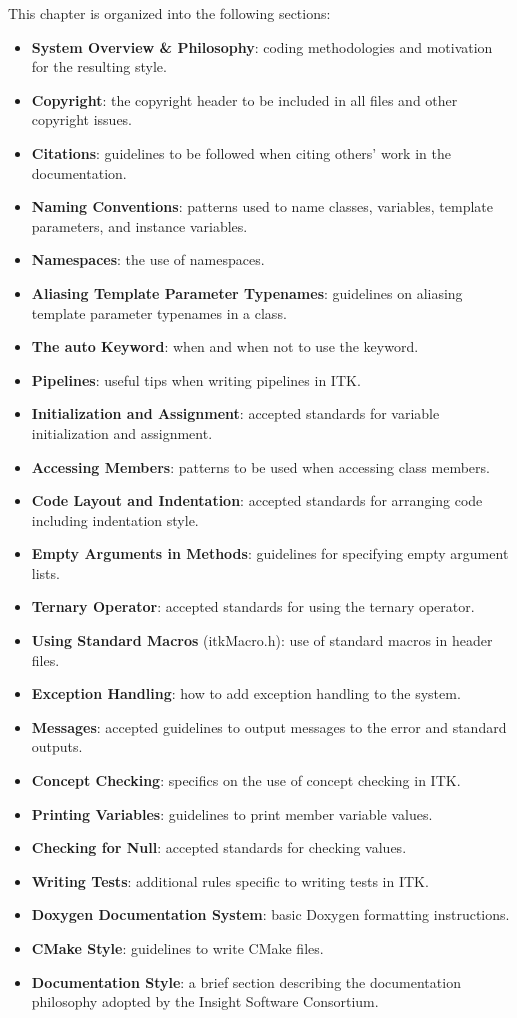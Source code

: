 This chapter is organized into the following sections:
\begin{itemize}
\item \textbf{System Overview \& Philosophy}: coding methodologies and
motivation for the resulting style.
\item \textbf{Copyright}: the copyright header to be included in all files and
other copyright issues.
\item \textbf{Citations}: guidelines to be followed when citing others' work in
the documentation.
\item \textbf{Naming Conventions}: patterns used to name classes, variables,
template parameters, and instance variables.
\item \textbf{Namespaces}: the use of namespaces.
\item \textbf{Aliasing Template Parameter Typenames}: guidelines on aliasing
template parameter typenames in a class.
\item \textbf{The auto Keyword}: when and when not to use the 
keyword.
\item \textbf{Pipelines}: useful tips when writing pipelines in ITK.
\item \textbf{Initialization and Assignment}: accepted standards for variable
initialization and assignment.
\item \textbf{Accessing Members}: patterns to be used when accessing class
members.
\item \textbf{Code Layout and Indentation}: accepted standards for arranging
code including indentation style.
\item \textbf{Empty Arguments in Methods}: guidelines for specifying empty
argument lists.
\item \textbf{Ternary Operator}: accepted standards for using the ternary
operator.
\item \textbf{Using Standard Macros} (itkMacro.h): use of standard macros in
header files.
\item \textbf{Exception Handling}: how to add exception handling to the system.
\item \textbf{Messages}: accepted guidelines to output messages to the error
and standard outputs.
\item \textbf{Concept Checking}: specifics on the use of concept checking in
ITK.
\item \textbf{Printing Variables}: guidelines to print member variable values.
\item \textbf{Checking for Null}: accepted standards for checking 
values.
\item \textbf{Writing Tests}: additional rules specific to writing tests in ITK.
\item \textbf{Doxygen Documentation System}: basic Doxygen formatting
instructions.
\item \textbf{CMake Style}: guidelines to write CMake files.
\item \textbf{Documentation Style}: a brief section describing the
documentation philosophy adopted by the Insight Software Consortium.
\end{itemize}

